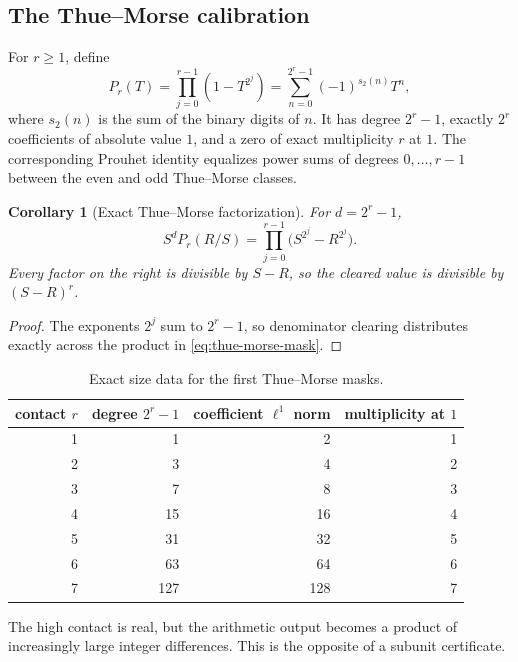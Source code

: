 \documentclass[11pt,oneside]{article}
\newtheorem{corollary}[theorem]{Corollary}
\theoremstyle{definition}
\theoremstyle{remark}
\begin{document}
\subsection{The Thue--Morse calibration}

For $r\ge1$, define
\begin{equation}
 P_r(T)=\prod_{j=0}^{r-1}(1-T^{2^j})
       =\sum_{n=0}^{2^r-1}(-1)^{s_2(n)}T^n,
 \label{eq:thue-morse-mask}
\end{equation}
where $s_2(n)$ is the sum of the binary digits of $n$.  It has degree $2^r-1$, exactly
$2^r$ coefficients of absolute value $1$, and a zero of exact multiplicity $r$ at $1$.
The corresponding Prouhet identity equalizes power sums of degrees $0,\ldots,r-1$ between
the even and odd Thue--Morse classes.

\begin{corollary}[Exact Thue--Morse factorization]
\label{cor:thue-morse-factorization}
For $d=2^r-1$,
\begin{equation}
 S^dP_r(R/S)
 =\prod_{j=0}^{r-1}\bigl(S^{2^j}-R^{2^j}\bigr).
 \label{eq:thue-morse-cleared}
\end{equation}
Every factor on the right is divisible by $S-R$, so the cleared value is divisible by
$(S-R)^r$.
\end{corollary}

\begin{proof}
The exponents $2^j$ sum to $2^r-1$, so denominator clearing distributes exactly across the
product in \eqref{eq:thue-morse-mask}.
\end{proof}

\begin{table}[ht]
\centering
\caption{Exact size data for the first Thue--Morse masks.}
\label{tab:thue-morse}
\begin{tabular}{@{}rrrr@{}}
\toprule
contact $r$ & degree $2^r-1$ & coefficient $\ell^1$ norm & multiplicity at $1$\\
\midrule
1&1&2&1\\
2&3&4&2\\
3&7&8&3\\
4&15&16&4\\
5&31&32&5\\
6&63&64&6\\
7&127&128&7\\
\bottomrule
\end{tabular}
\end{table}

The high contact is real, but the arithmetic output becomes a product of increasingly large
integer differences.  This is the opposite of a subunit certificate.
\end{document}
